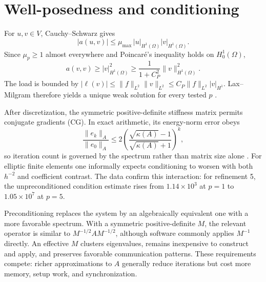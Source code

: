 \documentclass[10pt,a4paper]{article}
\begin{document}
\newpage
\section{Well-posedness and conditioning}
For $u,v\in V$, Cauchy--Schwarz gives
\begin{equation}
 |a(u,v)|\le \mu_{\max}\,|u|_{H^1(\Omega)}|v|_{H^1(\Omega)}.
\end{equation}
Since $\mu_p\ge1$ almost everywhere and Poincar\'e's inequality holds on $H_0^1(\Omega)$,
\begin{equation}
    a(v,v) \ge |v|_{H^1(\Omega)}^2
    \ge \frac{1}{1+C_P^2}\|v\|_{H^1(\Omega)}^2.
\end{equation}
The load is bounded by $|\ell(v)|\le\|f\|_{L^2}\|v\|_{L^2}\le
C_P\|f\|_{L^2}|v|_{H^1}$. Lax--Milgram therefore yields a unique weak solution for every
tested $p$ \cite{quarteroni2017}.

After discretization, the symmetric positive-definite stiffness matrix permits conjugate gradients
(CG). In exact arithmetic, its energy-norm error obeys
\begin{equation}
 \frac{\|e_k\|_A}{\|e_0\|_A}
 \le 2\left(\frac{\sqrt{\kappa(A)}-1}{\sqrt{\kappa(A)}+1}\right)^k,
 \label{eq:cg-bound}
\end{equation}
so iteration count is governed by the spectrum rather than matrix size alone \cite{saad2003}.
For elliptic finite elements one informally expects conditioning to worsen with both $h^{-2}$ and
coefficient contrast. The data confirm this interaction: for refinement 5, the unpreconditioned
condition estimate rises from $1.14\times10^3$ at $p=1$ to $1.05\times10^7$ at $p=5$.

Preconditioning replaces the system by an algebraically equivalent one with a more favorable
spectrum. With a symmetric positive-definite $M$, the relevant operator is similar to
$M^{-1/2}AM^{-1/2}$, although software commonly applies $M^{-1}$ directly. An effective $M$
clusters eigenvalues, remains inexpensive to construct and apply, and preserves favorable
communication patterns. These requirements compete: richer approximations to $A$ generally
reduce iterations but cost more memory, setup work, and synchronization.

\newpage
\end{document}
